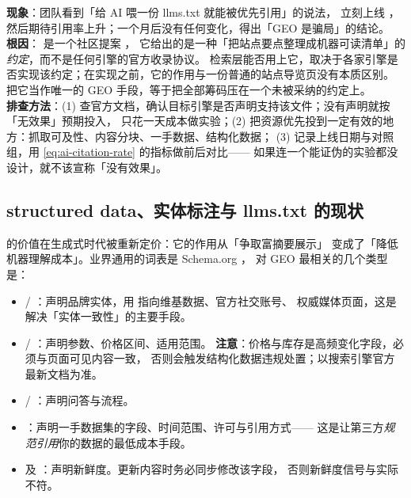 \begin{pitfall}
\textbf{现象}：团队看到「给 AI 喂一份 llms.txt 就能被优先引用」的说法，
立刻上线 ，然后期待引用率上升；一个月后没有任何变化，得出「GEO 是骗局」的结论。\\
\textbf{根因}： 是一个社区提案 \cite{openaillmstxt}，
它给出的是一种「把站点要点整理成机器可读清单」的\emph{约定}，而不是任何引擎的官方收录协议。
检索层能否用上它，取决于各家引擎是否实现该约定；在实现之前，它的作用与一份普通的站点导览页没有本质区别。
把它当作唯一的 GEO 手段，等于把全部筹码压在一个未被采纳的约定上。\\
\textbf{排查方法}：(1) 查官方文档，确认目标引擎是否声明支持该文件；没有声明就按「无效果」预期投入，
只花一天成本做实验；(2) 把资源优先投到一定有效的地方：抓取可及性、内容分块、一手数据、结构化数据；
(3) 记录上线日期与对照组，用 \cref{eq:ai-citation-rate} 的指标做前后对比——
如果连一个能证伪的实验都没设计，就不该宣称「没有效果」。
\end{pitfall}

\subsection{structured data、实体标注与 llms.txt 的现状}

的价值在生成式时代被重新定价：它的作用从「争取富摘要展示」
变成了「降低机器理解成本」。业界通用的词表是 Schema.org \cite{schemaorg}，
对 GEO 最相关的几个类型是：

\begin{itemize}
  \item {} / ：声明品牌实体，用  指向维基数据、官方社交账号、
        权威媒体页面，这是解决「实体一致性」的主要手段。
  \item {} / ：声明参数、价格区间、适用范围。
        \textbf{注意}：价格与库存是高频变化字段，必须与页面可见内容一致，
        否则会触发结构化数据违规处置；以搜索引擎官方最新文档为准。
  \item {} / ：声明问答与流程。
  \item {}：声明一手数据集的字段、时间范围、许可与引用方式——
        这是让第三方\emph{规范引用}你的数据的最低成本手段。
  \item {} 及 ：声明新鲜度。更新内容时务必同步修改该字段，
        否则新鲜度信号与实际不符。
\end{itemize}

